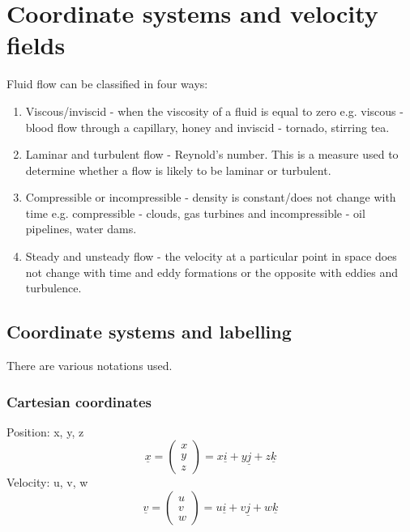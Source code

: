 \documentclass[class=report, crop=false, 12pt,a4paper]{standalone}
\begin{document}
\section{Coordinate systems and velocity fields}
Fluid flow can be classified in four ways:
\begin{enumerate}[noitemsep]
  \item Viscous/inviscid - when the viscosity of a fluid is equal to zero e.g. viscous -  blood flow through a capillary, honey and inviscid - tornado, stirring tea.
  \item Laminar and turbulent flow - Reynold's number. This is a measure used to determine whether a flow is likely to be laminar or turbulent.
  \item Compressible or incompressible - density is constant/does not change with time e.g. compressible - clouds, gas turbines and incompressible - oil pipelines, water dams.
  \item Steady and unsteady flow - the velocity at a particular point in space does not change with time and eddy formations or the opposite with eddies and turbulence.
\end{enumerate}
\subsection{Coordinate systems and labelling}
There are various notations used.
\subsubsection{Cartesian coordinates}
Position: x, y, z
\begin{equation} 
  \underline{x} = 
  \begin{pmatrix}
    x\\
    y\\
    z
  \end{pmatrix} = 
  x\underline{i} + y\underline{j} + z\underline{k} 
\end{equation}
Velocity: u, v, w
\begin{equation} 
  \underline{v} = 
  \begin{pmatrix}
    u\\
    v\\
    w
  \end{pmatrix} = 
  u\underline{i} + v\underline{j} + w\underline{k} 
\end{equation}
\end{document}
